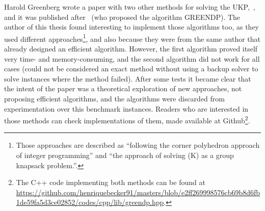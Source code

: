 
Harold Greenberg wrote a paper with two other methods for solving the UKP,~\cite{on_equivalent_greenberg}, and it was published after~\cite{green_improv} (who proposed the algorithm GREENDP).
The author of this thesis found interesting to implement those algorithms too, as they used different approaches\footnote{Those approaches are described as ``following the corner polyhedron approach of integer programming'' and ``the approach of solving (K) as a group knapsack problem.''.}, and also because they were from the same author that already designed an efficient algorithm.
However, the first algorithm proved itself very time- and memory-consuming, and the second algorithm did not work for all cases (could not be considered an exact method without using a backup solver to solve instances where the method failed).
After some tests it became clear that the intent of the paper was a theoretical exploration of new approaches, not proposing efficient algorithms, and the algorithms were discarded from experimentation over this benchmark instances.
Readers who are interested in those methods can check implementations of them, made available at Github\footnote{The C++ code implementing both methods can be found at \url{https://github.com/henriquebecker91/masters/blob/e2ff269998576cb69b8d6fb1de59fa5d3ce02852/codes/cpp/lib/greendp.hpp}.}.

